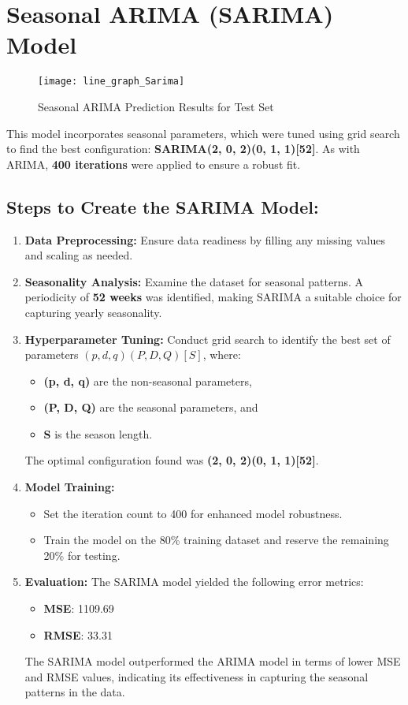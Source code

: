 \section*{Seasonal ARIMA (SARIMA) Model}

\begin{figure}[H]
	\centering
	\texttt{[image: line\_graph\_Sarima]}
	\caption{Seasonal ARIMA Prediction Results for Test Set}
	\label{fig:Sarima_result}
\end{figure}

This model incorporates seasonal parameters, which were tuned using grid search to find the best configuration: \textbf{SARIMA(2, 0, 2)(0, 1, 1)[52]}. As with ARIMA, \textbf{400 iterations} were applied to ensure a robust fit.

\subsection*{Steps to Create the SARIMA Model:}
\begin{enumerate}
	\item \textbf{Data Preprocessing:}  
	Ensure data readiness by filling any missing values and scaling as needed.
	
	\item \textbf{Seasonality Analysis:}  
	Examine the dataset for seasonal patterns. A periodicity of \textbf{52 weeks} was identified, making SARIMA a suitable choice for capturing yearly seasonality.
	
	\item \textbf{Hyperparameter Tuning:}  
	Conduct grid search to identify the best set of parameters $(p, d, q)(P, D, Q)[S]$, where:
	\begin{itemize}
		\item \textbf{(p, d, q)} are the non-seasonal parameters,
		\item \textbf{(P, D, Q)} are the seasonal parameters, and
		\item \textbf{S} is the season length.
	\end{itemize}
	The optimal configuration found was \textbf{(2, 0, 2)(0, 1, 1)[52]}.
	
	\item \textbf{Model Training:}
	\begin{itemize}
		\item Set the iteration count to 400 for enhanced model robustness.
		\item Train the model on the 80\% training dataset and reserve the remaining 20\% for testing.
	\end{itemize}
	
	\item \textbf{Evaluation:}  
	The SARIMA model yielded the following error metrics:
	\begin{itemize}
		\item \textbf{MSE}: 1109.69
		\item \textbf{RMSE}: 33.31
	\end{itemize}
	The SARIMA model outperformed the ARIMA model in terms of lower MSE and RMSE values, indicating its effectiveness in capturing the seasonal patterns in the data.
\end{enumerate}

